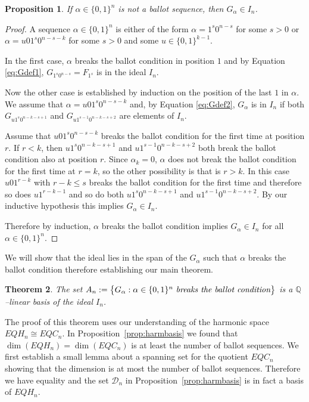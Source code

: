 \documentclass[11pt,oneside]{amsart}
\newtheorem{theorem}{Theorem}[section]
\newtheorem{prop}[theorem]{Proposition}
\theoremstyle{definition}
\numberwithin{equation}{section}
\begin{document}
\begin{prop}\label{prop:notballotimpliescontains}
If $\alpha \in \{0,1\}^n$ is not a ballot sequence, then $G_\alpha \in I_n$.
\end{prop}

\begin{proof}
A sequence $\alpha \in \{ 0, 1\}^n$ is either of the form
$\alpha = 1^s0^{n-s}$ for some $s > 0$ or
$\alpha = u01^s0^{n-s-k}$ for some $s>0$ and some $u \in \{0,1\}^{k-1}$.

In the first case, $\alpha$ breaks the ballot condition in position $1$
and by Equation \eqref{eq:Gdef1}, $G_{1^s0^{n-s}} = F_{1^s}$
is in the ideal $I_n$.

Now the other case is established by
induction on the position of the last $1$ in $\alpha$.
We assume that
$\alpha = u01^s0^{n-s-k}$ and, by Equation \eqref{eq:Gdef2},
$G_\alpha$ is in $I_n$ if both
$G_{u1^s0^{n-k-s+1}}$ and $G_{u1^{s-1}0^{n-k-s+2}}$
are elements of $I_n$.

Assume that $u01^s0^{n-s-k}$
breaks the ballot condition for the first time at position $r$.
If $r<k$, then
$u1^s0^{n-k-s+1}$ and $u1^{s-1}0^{n-k-s+2}$
both break the ballot condition also at position $r$.
Since $\alpha_k=0$, $\alpha$ does not break the ballot condition for the first
time at $r=k$, so the other possibility is that is $r>k$.
In this case $u01^{r-k}$ with $r-k \leq s$ breaks the ballot condition for the first time
and therefore so does $u1^{r-k-1}$ and so do both
$u1^s0^{n-k-s+1}$ and $u1^{s-1}0^{n-k-s+2}$.
By our inductive hypothesis this implies $G_\alpha \in I_n$.

Therefore by induction, $\alpha$ breaks the ballot condition implies $G_\alpha \in I_n$
for all $\alpha \in \{0,1\}^n$.
\end{proof}

We will  show that the ideal lies in the span of the $G_\alpha$ such
that $\alpha$ breaks the ballot condition therefore establishing our main theorem.

\begin{theorem}\label{thm:basisofideal}
The set $A_n:=\big\{ G_\alpha : \alpha \in \{0,1\}^n \text{ \it breaks the ballot condition}\big\}$
is a $\mathbb Q$--linear basis of the ideal $I_n$.
\end{theorem}

The proof of this theorem uses our understanding of the harmonic space $EQH_n\cong EQC_n$.
In Proposition~\ref{prop:harmbasis} we found that $\dim(EQH_n)=\dim(EQC_n)$ is at least the number of ballot sequences.
We first establish a small lemma about a spanning set for the quotient $EQC_n$ showing that  the dimension is at most  the number of ballot sequences.
Therefore we have equality
and the set ${\mathcal D}_n$ in Proposition~\ref{prop:harmbasis} is in fact a basis
of $EQH_n$.
\end{document}
